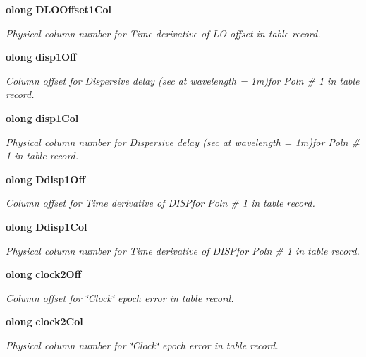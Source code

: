 \begin{CompactItemize}
{\bf olong} {\bf DLOOffset1Col}
\begin{CompactList}\small\item\em Physical column number for Time derivative of LO offset in table record. \item\end{CompactList}\item 
{\bf olong} {\bf disp1Off}
\begin{CompactList}\small\item\em Column offset for Dispersive delay (sec at wavelength = 1m)for Poln \# 1 in table record. \item\end{CompactList}\item 
{\bf olong} {\bf disp1Col}
\begin{CompactList}\small\item\em Physical column number for Dispersive delay (sec at wavelength = 1m)for Poln \# 1 in table record. \item\end{CompactList}\item 
{\bf olong} {\bf Ddisp1Off}
\begin{CompactList}\small\item\em Column offset for Time derivative of DISPfor Poln \# 1 in table record. \item\end{CompactList}\item 
{\bf olong} {\bf Ddisp1Col}
\begin{CompactList}\small\item\em Physical column number for Time derivative of DISPfor Poln \# 1 in table record. \item\end{CompactList}\item 
{\bf olong} {\bf clock2Off}
\begin{CompactList}\small\item\em Column offset for \char`\"{}Clock\char`\"{} epoch error in table record. \item\end{CompactList}\item 
{\bf olong} {\bf clock2Col}
\begin{CompactList}\small\item\em Physical column number for \char`\"{}Clock\char`\"{} epoch error in table record. \item\end{CompactList}\item 

\end{CompactItemize}
